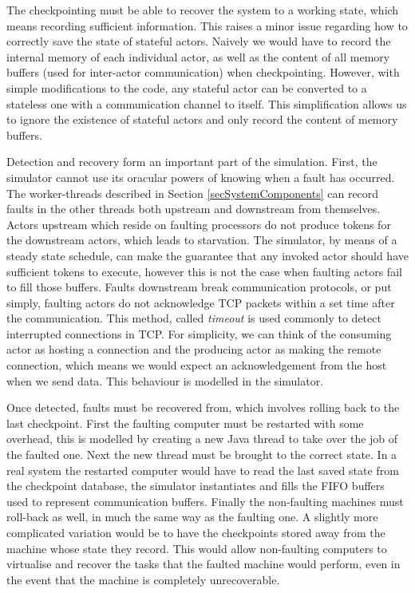 The checkpointing must be able to recover the system to a working state, which means recording sufficient information.
This raises a minor issue regarding how to correctly save the state of stateful actors.
Naively we would have to record the internal memory of each individual actor, as well as the content of all memory buffers (used for inter-actor communication) when checkpointing.
However, with simple modifications to the code, any stateful actor can be converted to a stateless one with a communication channel to itself.
This simplification allows us to ignore the existence of stateful actors and only record the content of memory buffers.

Detection and recovery form an important part of the simulation.
First, the simulator cannot use its oracular powers of knowing when a fault has occurred.
The worker-threads described in Section \ref{secSystemComponents} can record faults in the other threads both upstream and downstream from themselves.
Actors upstream which reside on faulting processors do not produce tokens for the downstream actors, which leads to starvation.
The simulator, by means of a steady state schedule, can make the guarantee that any invoked actor should have sufficient tokens to execute, however this is not the case when faulting actors fail to fill those buffers.
Faults downstream break communication protocols, or put simply, faulting actors do not acknowledge TCP packets within a set time after the communication.
This method, called {\em timeout} is used commonly to detect interrupted connections in TCP.
For simplicity, we can think of the consuming actor as hosting a connection and the producing actor as making the remote connection, which means we would expect an acknowledgement from the host when we send data.
This behaviour is modelled in the simulator.

Once detected, faults must be recovered from, which involves rolling back to the last checkpoint.
First the faulting computer must be restarted with some overhead, this is modelled by creating a new Java thread to take over the job of the faulted one.
Next the new thread must be brought to the correct state.
In a real system the restarted computer would have to read the last saved state from the checkpoint database, the simulator instantiates and fills the FIFO buffers used to represent communication buffers.
Finally the non-faulting machines must roll-back as well, in much the same way as the faulting one.
A slightly more complicated variation would be to have the checkpoints stored away from the machine whose state they record.
This would allow non-faulting computers to virtualise and recover the tasks that the faulted machine would perform, even in the event that the machine is completely unrecoverable.

